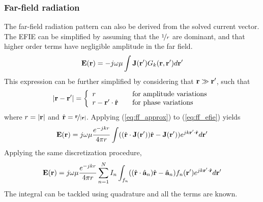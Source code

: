 \subsubsection{Far-field radiation}
The far-field radiation pattern can also be derived from the solved current vector. The EFIE can be simplified by assuming that the $\nicefrac{1}{r}$ are dominant, and that higher order terms have negligible amplitude in the far field.
\begin{equation}
	\mathbf{E}(\mathbf{r}) = -j\omega\mu \int \mathbf{J}(\mathbf{r}^\prime) G_k(\mathbf{r}, \mathbf{r}^\prime) d\mathbf{r}^\prime
	\label{eq:ff_efie}
\end{equation}
This expression can be further simplified by considering that $\mathbf{r} \gg \mathbf{r}^\prime$, such that
\begin{equation}
	|\mathbf{r} - \mathbf{r}^\prime| = \left\{ \begin{array}{ll}
		r \quad & \text{for amplitude variations} \\
		r - \mathbf{r}^\prime \cdot \hat{\mathbf{r}} \quad & \text{for phase variations}
	\end{array} \right.
	\label{eq:ff_approx}
\end{equation}
where $r = |\mathbf{r}|$ and $\hat{\mathbf{r}} = \nicefrac{\mathbf{r}}{|\mathbf{r}|}$. Applying (\ref{eq:ff_approx}) to (\ref{eq:ff_efie}) yields
\begin{equation}
	\mathbf{E}(\mathbf{r}) = j\omega\mu \frac{e^{-j k r}}{4\pi r} \int ((\hat{\mathbf{r}} \cdot \mathbf{J}(\mathbf{r}^\prime)) \hat{\mathbf{r}} - \mathbf{J}(\mathbf{r}^\prime)) e^{j k \mathbf{r}^\prime \cdot \hat{\mathbf{r}}} d\mathbf{r}^\prime
\end{equation}
Applying the same discretization procedure,
\begin{equation}
	\mathbf{E}(\mathbf{r}) = j\omega\mu \frac{e^{-j k r}}{4\pi r} \sum_{n = 1}^{N} I_n \int_{f_n} ((\hat{\mathbf{r}} \cdot \hat{\mathbf{a}}_n) \hat{\mathbf{r}} - \hat{\mathbf{a}}_n) f_n(\mathbf{r}^\prime) e^{j k \mathbf{r}^\prime \cdot \hat{\mathbf{r}}} d\mathbf{r}^\prime
\end{equation}
The integral can be tackled using quadrature and all the terms are known.